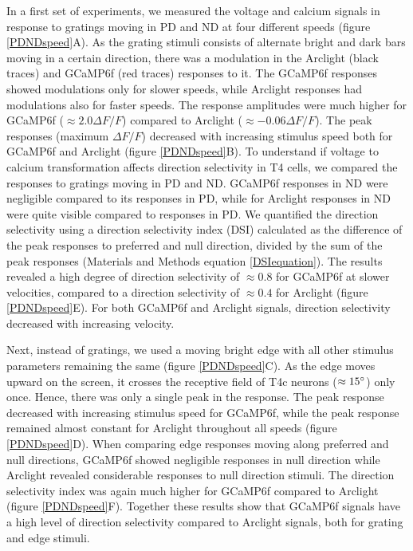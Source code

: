\documentclass[9pt,lineno]{elife}
\begin{document}
In a first set of experiments, we measured the voltage and calcium signals in response to gratings moving in PD and ND at four different speeds (figure \ref{PDNDspeed}A). As the grating stimuli consists of alternate bright and dark bars moving in a certain direction, there was a modulation in the Arclight (black traces) and GCaMP6f (red traces) responses to it. The GCaMP6f responses showed modulations only for slower speeds, while Arclight responses had modulations also for faster speeds. The response amplitudes were much higher for GCaMP6f ($\approx2.0 \Delta F/F$) compared to Arclight ($\approx -0.06 \Delta F/F$). The peak responses (maximum $\Delta F/F$) decreased with increasing stimulus speed both for GCaMP6f and Arclight (figure \ref{PDNDspeed}B). To understand if voltage to calcium transformation affects direction selectivity in T4 cells, we compared the responses to gratings moving in PD and ND. GCaMP6f responses in ND were negligible compared to its responses in PD, while for Arclight responses in ND were quite visible compared to responses in PD. We quantified the direction selectivity using a direction selectivity index (DSI) calculated as the difference of the peak responses to preferred and null direction, divided by the sum of the peak responses (Materials and Methods equation \eqref{DSIequation}). The results revealed a high degree of direction selectivity of $\approx0.8$ for GCaMP6f at slower velocities, compared to a direction selectivity of $\approx0.4$ for Arclight (figure \ref{PDNDspeed}E). For both GCaMP6f and Arclight signals, direction selectivity decreased with increasing velocity.

Next, instead of gratings, we used a moving bright edge with all other stimulus parameters remaining the same (figure \ref{PDNDspeed}C). As the edge moves upward on the screen, it crosses the receptive field of T4c neurons ($\approx15\degree$) only once. Hence, there was only a single peak in the response. The peak response decreased with increasing stimulus speed for GCaMP6f, while the peak response remained almost constant for Arclight throughout all speeds (figure \ref{PDNDspeed}D). When comparing edge responses moving along preferred and null directions, GCaMP6f showed negligible responses in null direction while Arclight revealed considerable responses to null direction stimuli. The direction selectivity index was again much higher for GCaMP6f compared to Arclight (figure \ref{PDNDspeed}F). Together these results show that GCaMP6f signals have a high level of direction selectivity compared to Arclight signals, both for grating and edge stimuli.
\end{document}
